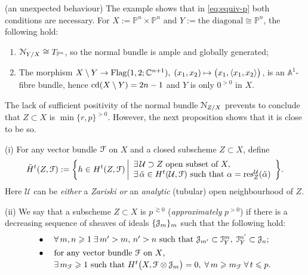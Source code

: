 \documentclass[11pt,reqno]{amsart}
\let\euf\EuScript
\let\cal\mathcal
\let\mbb\mathbb
\let\tld\tilde
\let\nit\noindent
\let\lan\langle
\let\ran\rangle
\numberwithin{equation}{section}
\numberwithin{figure}{section}
\let\ges\geqslant
\let\les\leqslant
\begin{document}
\begin{m-example}\label{expl:strange}
(an unexpected behaviour)\quad 
The example shows that in \eqref{eq:equiv-p} both conditions are necessary. 
For $X:=\mbb P^n\times\mbb P^n$ and $Y:=\text{the diagonal}\cong\mbb P^n$, the following hold:
\begin{enumerate}
\item 
$\euf N_{Y/X}\cong T_{\mbb P^n}$, so the normal bundle is ample 
and globally generated;
\item 
The morphism  
$X\setminus Y\to{\rm Flag}(1, 2;\mbb C^{n+1}),\; 
(x_1,x_2)\mapsto \big(x_1,{{\lan {x_1,x_2}\ran}}\big)$, 
is an $\mbb A^1$-fibre bundle, hence ${{\rm cd}}(X\setminus Y)=2n-1$ 
and $Y$ is only $0^{>0}$ in $X$. 
\end{enumerate} 
\end{m-example}

The lack of sufficient positivity of the normal bundle ${{\euf N}}_{Z/X}$ prevents to conclude 
that $Z\subset X$ is $\min\{r,p\}^{{>0}}$. However, the next proposition shows that it is 
close to be so.

\begin{m-definition}\label{def:ap>0} 
\nit(i) 
For any vector bundle ${{\euf F}}$ on $X$ and a closed subscheme $Z\subset X$, define 
$$
\tld H^t(Z,{{\euf F}}) :=
\bigg\{
h\in H^t(Z,{{\euf F}})\,\biggl|
\begin{array}{l}
\exists\,{{\cal U}}\supset Z\text{ open subset of }X,\\ 
\exists\,\tld\alpha\in H^t({{\cal U}},{{\euf F}})\text{ such that }\alpha={{\rm res}}^{{\cal U}}_{Z}(\tld\alpha)
\end{array}\biggr.
\bigg\}.
$$
Here ${{\cal U}}$ can be \emph{either} a \emph{Zariski or} an \emph{analytic} 
(tubular) open neighbourhood of $Z$. 

\nit(ii) 
We say that a subscheme $Z\subset X$ is $p^{{\,\gtrsim0}}$ (\emph{approximately} $p^{{>0}}$) 
if there is a decreasing sequence of sheaves of ideals $\{{{\euf J}}_m\}_{m}$ such that 
the following hold:  
\begin{equation}\label{eq:ap}
\begin{array}{ll}
\bullet\;&
\forall\,m,n\ges1\;\exists\,m'>m,\,n'>n\text{ such that }
{{\euf J}}_{m'}\subset{{\euf I}}_Y^m,\;{{\euf I}}_Y^{n'}\subset{{\euf J}}_{n};
\\[1ex] 
\bullet\;&
\text{for any vector bundle ${{\euf F}}$ on $X$,}
\\[.5ex]
&
\exists\,m_{{\euf F}}\ges1\text{ such that }H^t\big(X,{{\euf F}}\otimes{{{\euf J}}_{m}}\big)=0,
\;\forall\,m\ges m_{{\euf F}}\;\forall\,t\les p.
\end{array}
\end{equation}
\end{m-definition}
\end{document}
